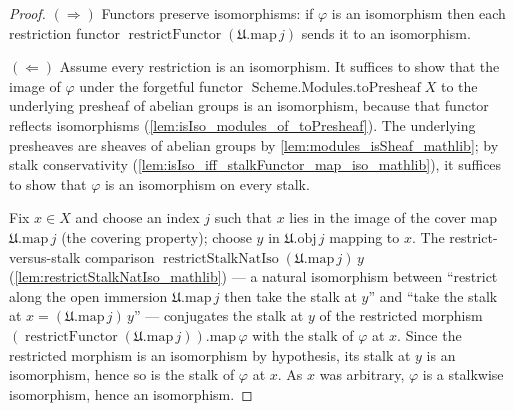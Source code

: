 \begin{proof}
  \((\Rightarrow)\) Functors preserve isomorphisms: if \(\varphi\) is an isomorphism then each
  restriction functor \(\operatorname{restrictFunctor}(\mathfrak{U}.\mathrm{map}\,j)\) sends it to
  an isomorphism.

  \((\Leftarrow)\) Assume every restriction is an isomorphism. It suffices to show that the image
  of \(\varphi\) under the forgetful functor \(\operatorname{Scheme.Modules.toPresheaf} X\) to the
  underlying presheaf of abelian groups is an isomorphism, because that functor reflects
  isomorphisms (\cref{lem:isIso_modules_of_toPresheaf}). The underlying presheaves are
  sheaves of abelian groups by \cref{lem:modules_isSheaf_mathlib}; by stalk
  conservativity (\cref{lem:isIso_iff_stalkFunctor_map_iso_mathlib}), it suffices to
  show that \(\varphi\) is an isomorphism on every stalk.

  Fix \(x \in X\) and choose an index \(j\) such that \(x\) lies in the image of the cover map
  \(\mathfrak{U}.\mathrm{map}\,j\) (the covering property); choose \(y\) in
  \(\mathfrak{U}.\mathrm{obj}\,j\) mapping to \(x\). The restrict-versus-stalk comparison
  \(\operatorname{restrictStalkNatIso}(\mathfrak{U}.\mathrm{map}\,j)\,y\)
  (\cref{lem:restrictStalkNatIso_mathlib}) --- a natural isomorphism between ``restrict along the
  open immersion \(\mathfrak{U}.\mathrm{map}\,j\) then take the stalk at \(y\)'' and ``take the
  stalk at \(x = (\mathfrak{U}.\mathrm{map}\,j)\,y\)'' --- conjugates the stalk at \(y\) of the
  restricted morphism \((\operatorname{restrictFunctor}(\mathfrak{U}.\mathrm{map}\,j)).\mathrm{map}\,\varphi\)
  with the stalk of \(\varphi\) at \(x\). Since the restricted morphism is an
  isomorphism by hypothesis, its stalk at \(y\) is an isomorphism, hence so is the stalk of
  \(\varphi\) at \(x\). As \(x\) was arbitrary, \(\varphi\) is a stalkwise isomorphism, hence an
  isomorphism.
\end{proof}

